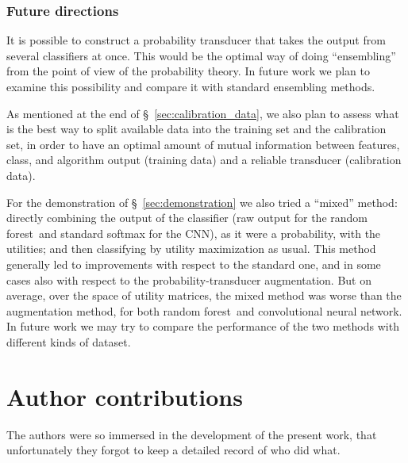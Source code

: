 \documentclass[a4paper,12pt,%
onecolumn,oneside,article,%
british%
]{memoir}
\newenvironment{contributions}{\section*{Author contributions}\addcontentsline{toc}{section}{Author contributions}}{\par}
\newcommand*{\wrench}{{\fontencoding{U}\fontfamily{fontawesomethree}\selectfont\symbol{114}}}
\newcommand{\mynotew}[1]{{\footnotesize\color{notecolour}\wrench\ #1}}
\renewcommand*{\|}[1][]{\nonscript\:#1\vert\nonscript\:\mathopen{}}
\newcommand*{\sect}{\S}%
\newcommand*{\RF}{random forest}
\newcommand*{\CNN}{convolutional neural network}
\begin{document}
\subsubsection{Future directions}
\label{sec:future}

It is possible to construct a probability transducer that takes the output from several classifiers at once. This would be the optimal way of doing \enquote{ensembling} from the point of view of the probability theory. In future work we plan to examine this possibility and compare it with standard ensembling methods.

As mentioned at the end of  \sect~\ref{sec:calibration_data}, we also plan to assess what is the best way to split available data into the training set and the calibration set, in order to have an optimal amount of mutual information between features, class, and algorithm output (training data) and a reliable transducer (calibration data).


For the demonstration of \sect~\ref{sec:demonstration} we also tried a \enquote{mixed} method: directly combining the output of the classifier (raw output for the \RF\ and standard softmax for the CNN), as it were a probability, with the utilities; and then classifying by utility maximization as usual. This method generally led to improvements with respect to the standard one, and in some cases also with respect to the probability-transducer augmentation. But on average, over the space of utility matrices, the mixed method was worse than the augmentation method, for both \RF\ and \CNN. In future work we may try to compare the performance of the two methods with different kinds of dataset.










\bigskip

\begin{contributions}
The authors were so immersed in the development of the present work, that unfortunately they forgot to keep a detailed record of who did what.
\end{contributions}
\end{document}
